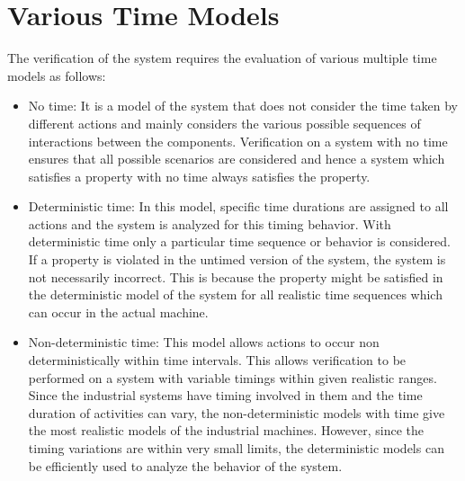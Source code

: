 \documentclass[letterpaper]{article}
\begin{document}
\section{Various Time Models}
\label{3}
The verification of the system requires the evaluation of various multiple time models as follows:
\begin{itemize}
	\item No time: It is a model of the system that does not consider the time taken by different actions and mainly considers the various possible sequences of interactions between the components. Verification on a system with no time ensures that all possible scenarios are considered and hence a system which satisfies a property with no time always satisfies the property.
	\item Deterministic time: In this model, specific time durations are assigned to all actions and the system is analyzed for this timing behavior. With deterministic time only a particular time sequence or behavior is considered. If a property is violated in the untimed version of the system, the system is not necessarily incorrect. This is because the property might be satisfied in the deterministic model of the system for all realistic time sequences which can occur in the actual machine.
	\item Non-deterministic time: This model allows actions to occur non deterministically within time intervals. This allows verification to be performed on a system with variable timings within given realistic ranges. Since the industrial systems have timing involved in them and the time duration of activities can vary, the non-deterministic models with time give the most realistic models of the industrial
machines. However, since the timing variations are within very small limits, the deterministic models can be efficiently used to analyze the behavior of the system.
\end{itemize}
        
\end{document}
